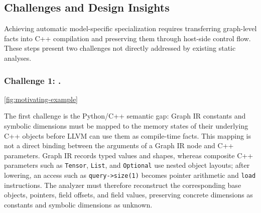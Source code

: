 \subsection{Challenges and Design Insights}
\label{sec:motivation:challenges}

{\color{red}%
\par}
{\color{blue}%
Achieving automatic model-specific specialization requires transferring graph-level facts into C++ compilation and preserving them through host-side control flow. These steps present two challenges not directly addressed by existing static analyses.
\par}

\subsubsection{Challenge 1: .}

{\color{red}%
\autoref{fig:motivating-example}
\par}
{\color{blue}%
The first challenge is the Python/C++ semantic gap: Graph IR constants and symbolic dimensions must be mapped to the memory states of their underlying C++ objects before LLVM can use them as compile-time facts. This mapping is not a direct binding between the arguments of a Graph IR node and C++ parameters. Graph IR records typed values and shapes, whereas composite C++ parameters such as \texttt{Tensor}, \texttt{List}, and \texttt{Optional} use nested object layouts; after lowering, an access such as \texttt{query->size(1)} becomes pointer arithmetic and \texttt{load} instructions. The analyzer must therefore reconstruct the corresponding base objects, pointers, field offsets, and field values, preserving concrete dimensions as constants and symbolic dimensions as unknown.
\par}

